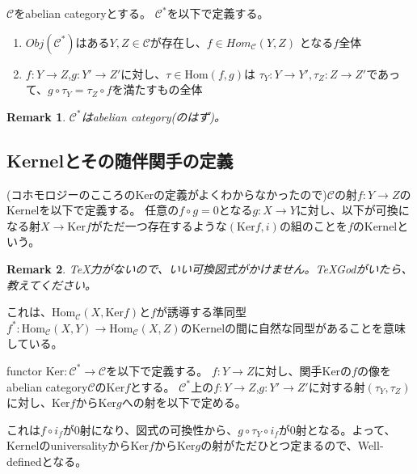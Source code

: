 \documentclass{ujarticle}
\newtheorem*{rem}{Remark}
\begin{document}
$\mathcal{C}$をabelian categoryとする。
$ \mathcal{C}^*$を以下で定義する。
\begin{enumerate}
  \item $Obj(\mathcal{C}^*)$はある$Y,Z \in \mathcal{C}$が存在し、$f \in Hom_{\mathcal{C}}(Y,Z)$
  となる$f$全体
  \item $f:Y \to Z$,$g:Y' \to Z'$に対し、$\tau \in \mathrm{Hom}(f,g)$は
  $\tau_Y:Y \to Y',\tau_Z:Z \to Z'$であって、$g \circ \tau_Y = \tau_Z \circ f$を満たすもの全体
\end{enumerate}
\begin{rem}
 $ \mathcal{C}^* $はabelian category(のはず)。
\end{rem}

\subsection{Kernelとその随伴関手の定義}
\label{sub:Kernelとその随伴関手の定義}

(コホモロジーのこころのKerの定義がよくわからなかったので)$ \mathcal{C} $の射$f:Y \to Z$のKernelを以下で定義する。
任意の$f \circ g = 0$となる$g:X \to Y$に対し、以下が可換になる射$X \to \mathrm{Ker}f$がただ一つ存在するような$(\mathrm{Ker}f,i)$の組のことを$f$のKernelという。

\begin{rem}
 TeX力がないので、いい可換図式がかけません。TeXGodがいたら、教えてください。
\end{rem}

これは、$\mathrm{Hom}_{\mathcal{C}}(X,\mathrm{Ker}f)$と$f$が誘導する準同型
$f^*:\mathrm{Hom}_{\mathcal{C}}(X,Y) \to \mathrm{Hom}_{\mathcal{C}}(X,Z)$のKernelの間に自然な同型があることを意味している。

functor $\mathrm{Ker}: \mathcal{C}^* \to \mathcal{C}$を以下で定義する。
$f: Y \to Z$に対し、関手Kerの$f$の像をabelian category$\mathcal{C}$のKer$f$とする。
$ \mathcal{C}^* $上の$f:Y \to Z$,$g:Y' \to Z'$に対する射$(\tau_Y,\tau_Z)$に対し、Ker$f$からKer$g$への射を以下で定める。


これは$f \circ i_f$が0射になり、図式の可換性から、$g \circ \tau_Y \circ i_f$が0射となる。よって、Kernelのuniversalityから$\mathrm{Ker}f$から$\mathrm{Ker}g$の射がただひとつ定まるので、Well-definedとなる。
\end{document}
